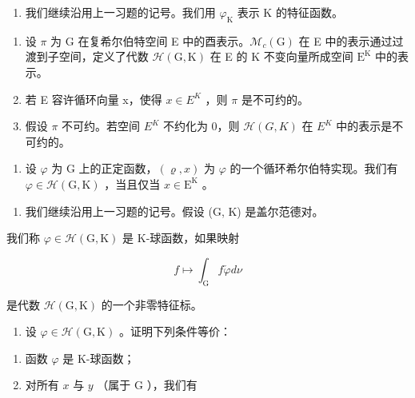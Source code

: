 \begin{enumerate}
\def\labelenumi{\arabic{enumi})}
\setcounter{enumi}{25}
\tightlist
\item
  我们继续沿用上一习题的记号。我们用 \(\varphi_{\mathrm{K}}\) 表示 K 的特征函数。
\end{enumerate}

\begin{enumerate}
\def\labelenumi{\alph{enumi})}
\item
  设 \(\pi\) 为 G 在复希尔伯特空间 E 中的酉表示。\(\mathcal{M}_c(\mathrm{G})\) 在 E 中的表示通过过渡到子空间，定义了代数 \(\mathcal{H}(\mathrm{G},\mathrm{K})\) 在 E 的 K 不变向量所成空间 \(\mathrm{E}^{\mathrm{K}}\) 中的表示。
\item
  若 E 容许循环向量 x，使得 \(x \in E^{K}\) ，则 \(\pi\) 是不可约的。
\item
  假设 \(\pi\) 不可约。若空间 \(E^{K}\) 不约化为 0，则 \(\mathcal{H}(G,K)\) 在 \(E^{K}\) 中的表示是不可约的。
\end{enumerate}

\begin{enumerate}
\def\labelenumi{\alph{enumi})}
\setcounter{enumi}{3}
\tightlist
\item
  设 \(\varphi\) 为 G 上的正定函数，\((\varrho, x)\) 为 \(\varphi\) 的一个循环希尔伯特实现。我们有 \(\varphi \in \mathcal{H}(\mathrm{G}, \mathrm{K})\) ，当且仅当 \(x \in \mathrm{E}^{\mathrm{K}}\) 。
\end{enumerate}

\begin{enumerate}
\def\labelenumi{\arabic{enumi})}
\setcounter{enumi}{26}
\tightlist
\item
  我们继续沿用上一习题的记号。假设 (G, K) 是盖尔范德对。
\end{enumerate}

我们称 \(\varphi\in\mathcal{H}(\mathrm{G},\mathrm{K})\) 是 K-球函数，如果映射

\[
f \mapsto \int_ {\mathrm{G}} f \check {\varphi} d \nu
\]

是代数 \(\mathcal{H}(\mathrm{G},\mathrm{K})\) 的一个非零特征标。

\begin{enumerate}
\def\labelenumi{\alph{enumi})}
\tightlist
\item
  设 \(\varphi \in \mathcal{H}(\mathrm{G},\mathrm{K})\) 。证明下列条件等价：
\end{enumerate}

\begin{enumerate}
\def\labelenumi{(\roman{enumi})}
\item
  函数 \(\varphi\) 是 K-球函数；
\item
  对所有 \(x\) 与 \(y\) （属于 \(\mathrm{G}\) ），我们有
\end{enumerate}

